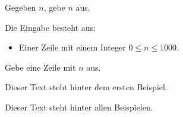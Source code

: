 \problemname{}

\newcommand{\maxn}{1000}

Gegeben $n$, gebe $n$ aus.

\begin{Input}
    Die Eingabe besteht aus:
    \begin{itemize}
        \item Einer Zeile mit einem Integer $0\leq n\leq \maxn$.
    \end{itemize}
\end{Input}

\begin{Output}
	Gebe eine Zeile mit $n$ aus.
\end{Output}

\nextsample{}
Dieser Text steht hinter dem ersten Beispiel.

\remainingsamples{}
Dieser Text steht hinter allen Beispielen.
